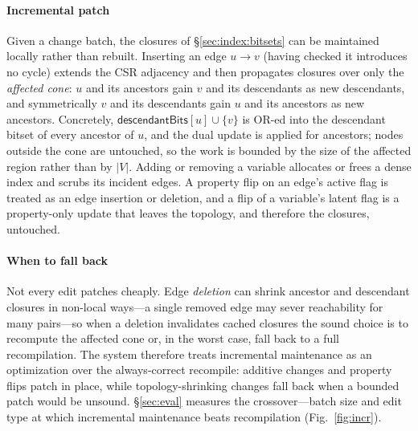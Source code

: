 \paragraph{Incremental patch}
Given a change batch, the closures of \S\ref{sec:index:bitsets} can be maintained
locally rather than rebuilt. Inserting an edge $u\!\to\!v$ (having checked it
introduces no cycle) extends the CSR adjacency and then propagates closures over
only the \emph{affected cone}: $u$ and its ancestors gain $v$ and its descendants
as new descendants, and symmetrically $v$ and its descendants gain $u$ and its
ancestors as new ancestors. Concretely, $\textsf{descendantBits}[u]\cup\{v\}$ is
OR-ed into the descendant bitset of every ancestor of $u$, and the dual update is
applied for ancestors; nodes outside the cone are untouched, so the work is
bounded by the size of the affected region rather than by $|V|$. Adding or
removing a variable allocates or frees a dense index and scrubs its incident
edges. A property flip on an edge's \textsf{active} flag is treated as an edge
insertion or deletion, and a flip of a variable's \textsf{latent} flag is a
property-only update that leaves the topology, and therefore the closures,
untouched.

\paragraph{When to fall back}
Not every edit patches cheaply. Edge \emph{deletion} can shrink ancestor and
descendant closures in non-local ways---a single removed edge may sever
reachability for many pairs---so when a deletion invalidates cached closures the
sound choice is to recompute the affected cone or, in the worst case, fall back to
a full recompilation. The system therefore treats incremental maintenance as an
optimization over the always-correct recompile: additive changes and property
flips patch in place, while topology-shrinking changes fall back when a bounded
patch would be unsound. \S\ref{sec:eval} measures the crossover---batch size and
edit type at which incremental maintenance beats recompilation
(Fig.~\ref{fig:incr}).

